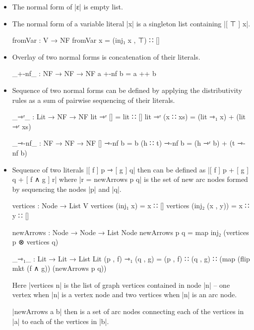 \begin{itemize}

\item{The normal form of |ε| is empty list.}
\item{The normal form of a variable literal |x| is a singleton list containing |[ ⊤ ] x|.
\begin{code}
  fromVar : V → NF
  fromVar x = (inj₁ x , ⊤) ∷ []
\end{code}}
\item{Overlay of two normal forms is concatenation of their literals.
\begin{code}
  _+-nf_ : NF → NF → NF
  a +-nf b = a ++ b
\end{code}}
\item{Sequence of two normal forms can be defined by applying the distributivity rules as a sum of pairwise sequencing of their literals.
\begin{code}
  _⇾ʳ_ : Lit → NF → NF
  lit ⇾ʳ [] = lit ∷ []
  lit ⇾ʳ (x ∷ xs) = (lit ⇾₁ x) + (lit ⇾ʳ xs)

  _⇾-nf_ : NF → NF → NF
  [] ⇾-nf b = b
  (h ∷ t) ⇾-nf b = (h ⇾ʳ b) + (t ⇾-nf b)
\end{code}}
\item{Sequence of two literals |[ f ] p ⇾ [ g ] q| then can be defined as |[ f ] p + [ g ] q + [ f ∧ g ] r| where |r = newArrows p q| is the set of new arc nodes formed by sequencing the nodes |p| and |q|.
\begin{code}
  vertices : Node → List V
  vertices (inj₁ x) = x ∷ []
  vertices (inj₂ (x , y)) = x ∷ y ∷ []
  
  newArrows : Node → Node → List Node
  newArrows p q = 
    map inj₂ (vertices p ⊗ vertices q)
  
  _⇾₁_ : Lit → Lit → List Lit
  (p , f) ⇾₁ (q , g) = (p , f) ∷ (q , g) 
      ∷ (map (flip mkt (f ∧ g)) (newArrows p q))
\end{code}
Here |vertices n| is the list of graph vertices contained in node |n| -- one vertex when |n| is a vertex node and two vertices when |n| is an arc node.

|newArrows a b| then is a set of arc nodes connecting each of the vertices in |a| to each of the vertices in |b|.
}
\end{itemize}


